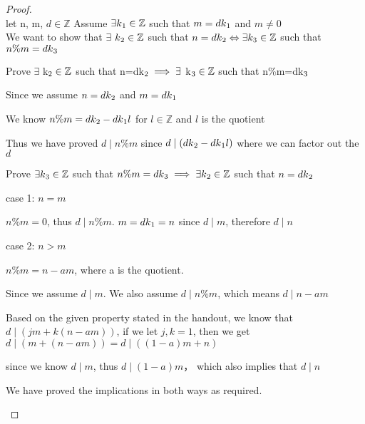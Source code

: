 \documentclass[11pt]{article}
\begin{document}
\begin{enumerate}
\begin{proof}\hfill\\
let n, m, $d \in \mathbb{Z}$
Assume $\exists k\textsubscript{1}\in \mathbb{Z}$ such that $m=dk\textsubscript{1}$ and $m \neq 0$\hfill\\
We want to show that $\exists$ $k\textsubscript{2}\in\mathbb{Z}$ such that $n=dk\textsubscript{2}\Leftrightarrow \exists k_{3}\in\mathbb{Z}$ such that $n\%m= dk\textsubscript{3}$ \hfill\\
\begin{center} Prove $\exists$ k$\textsubscript{2}\in\mathbb{Z}$ such that n=dk$\textsubscript{2}\implies\exists$ k$\textsubscript{3}\in\mathbb{Z}$ such that n\%m=dk$\textsubscript{3}$\colon\end{center}
\begin{center} Since we assume $n=dk\textsubscript{2}$ and $m=dk\textsubscript{1}$\end{center}
\begin{center} We know $n\%m = dk\textsubscript{2}-dk\textsubscript{1}l$ for $l\in \mathbb{Z}$ and $l$ is the quotient\end{center}
\begin{center} Thus we have proved $d\mid n\%m$ since $d\mid (dk\textsubscript{2}-dk\textsubscript{1}l)$ where we can factor out the $d$\end{center}
\begin{center} Prove $\exists k\textsubscript{3}\in \mathbb{Z}$ such that $n\%m= dk\textsubscript{3}\implies\exists k\textsubscript{2} \in\mathbb{Z}$ such that $n=dk\textsubscript{2}$\colon \end{center}
\begin{center} case 1: $n = m$ \colon\end{center}
\begin{center} $n\%m = 0$, thus $d\mid n\%m$. $m=dk\textsubscript{1}=n$ since $d\mid m$, therefore  $d\mid n$ \end{center}
\begin{center} case 2: $n > m$ \colon\end{center}
\begin{center} $n\%m = n-am$, where a is the quotient.\end{center}
\begin{center} Since we assume  $d\mid m$. We also assume $d\mid n\%m$, which means $d\mid n-am$\end{center}
\begin{center} Based on the given property stated in the handout, we know that $d\mid(jm+k(n-am))$, if we let $j,k = 1$, then we get $d\mid(m+(n-am))= d\mid((1-a)m+n)$\end{center}
\begin{center}since we know $d\mid m$, thus $d\mid (1-a)m$， which also implies that $d\mid n$ \end{center}
\begin{center} We have proved the implications in both ways as required.\end{center}


\end{proof}
\end{enumerate}
\end{document}
